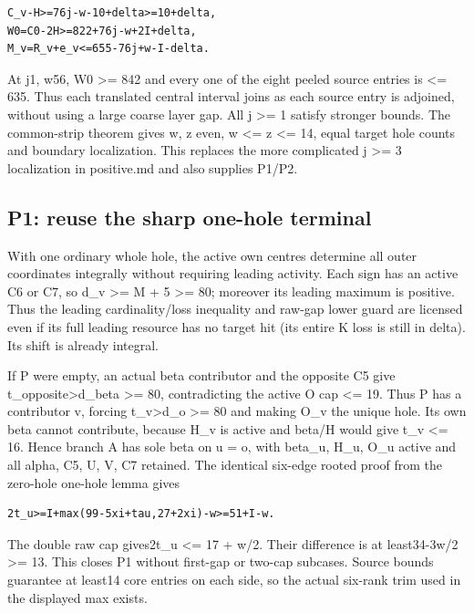 \documentclass[11pt,a4paper]{article}
\begin{document}
\begin{verbatim}
C_v-H>=76j-w-10+delta>=10+delta,
W0=C0-2H>=822+76j-w+2I+delta,
M_v=R_v+e_v<=655-76j+w-I-delta.
\end{verbatim}

At j1, w56, W0 \textgreater= 842 and every one of the eight peeled
source entries is \textless= 635. Thus each translated central interval
joins as each source entry is adjoined, without using a large coarse
layer gap. All j \textgreater= 1 satisfy stronger bounds. The
common-strip theorem gives w, z even, w \textless= z \textless= 14,
equal target hole counts and boundary localization. This replaces the
more complicated j \textgreater= 3 localization in positive.md and also
supplies P1/P2.

\hypertarget{p1-reuse-the-sharp-one-hole-terminal}{%
\subsection{P1: reuse the sharp one-hole
terminal}\label{p1-reuse-the-sharp-one-hole-terminal}}

With one ordinary whole hole, the active own centres determine all outer
coordinates integrally without requiring leading activity. Each sign has
an active C6 or C7, so d\_v \textgreater= M + 5 \textgreater= 80;
moreover its leading maximum is positive. Thus the leading
cardinality/loss inequality and raw-gap lower guard are licensed even if
its full leading resource has no target hit (its entire K loss is still
in delta). Its shift is already integral.

If P were empty, an actual beta contributor and the opposite C5 give
t\_opposite\textgreater d\_beta \textgreater= 80, contradicting the
active O cap \textless= 19. Thus P has a contributor v, forcing
t\_v\textgreater d\_o \textgreater= 80 and making O\_v the unique hole.
Its own beta cannot contribute, because H\_v is active and beta/H would
give t\_v \textless= 16. Hence branch A has sole beta on u = o, with
beta\_u, H\_u, O\_u active and all alpha, C5, U, V, C7 retained. The
identical six-edge rooted proof from the zero-hole one-hole lemma gives

\begin{verbatim}
2t_u>=I+max(99-5xi+tau,27+2xi)-w>=51+I-w.
\end{verbatim}

The double raw cap gives2t\_u \textless= 17 + w/2. Their difference is
at least34-3w/2 \textgreater= 13. This closes P1 without first-gap or
two-cap subcases. Source bounds guarantee at least14 core entries on
each side, so the actual six-rank trim used in the displayed max exists.
\end{document}
